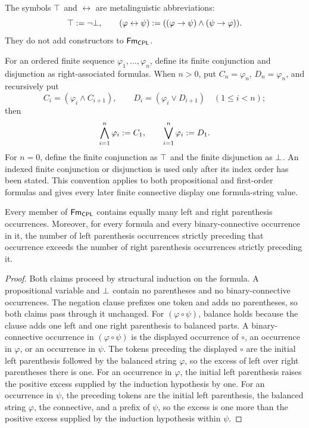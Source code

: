 \begin{definition}
The symbols \(\top\) and \(\leftrightarrow\) are metalinguistic
abbreviations:
\[
  \top\mathrel{:=}\neg\bot,
  \qquad
  (\varphi\leftrightarrow\psi)
  \mathrel{:=}((\varphi\to\psi)\land(\psi\to\varphi)).
\]
They do not add constructors to \(\mathsf{Fm}_{\mathsf{CPL}}\).
\end{definition}

For an ordered finite sequence \(\varphi_1,\ldots,\varphi_n\), define its
finite conjunction and disjunction as right-associated formulas.  When
\(n>0\), put \(C_n=\varphi_n\), \(D_n=\varphi_n\), and recursively put
\[
 C_i=(\varphi_i\land C_{i+1}),
 \qquad
 D_i=(\varphi_i\lor D_{i+1})
 \quad(1\leq i<n);
\]
then
\[
 \bigwedge_{i=1}^{n}\varphi_i\mathrel{:=} C_1,
 \qquad
 \bigvee_{i=1}^{n}\varphi_i\mathrel{:=} D_1.
\]
For \(n=0\), define the finite conjunction as \(\top\) and the finite
disjunction as \(\bot\).  An indexed finite conjunction or disjunction is
used only after its index order has been stated.  This convention applies to
both propositional and first-order formulas and gives every later finite
connective display one formula-string value.

\begin{lemma}
\label{lem:paren-count}
Every member of \(\mathsf{Fm}_{\mathsf{CPL}}\) contains equally many left and right
parenthesis occurrences.  Moreover, for every formula and every
binary-connective occurrence in it, the number of left parenthesis
occurrences strictly preceding that occurrence exceeds the number of right
parenthesis occurrences strictly preceding it.
\end{lemma}
\begin{proof}
Both claims proceed by structural induction on the formula.  A propositional
variable and \(\bot\) contain no parentheses and no binary-connective
occurrences.  The negation clause prefixes one token and adds no
parentheses, so both claims pass through it unchanged.  For
\((\varphi\circ\psi)\), balance holds because the clause adds one left and
one right parenthesis to balanced parts.  A binary-connective occurrence in
\((\varphi\circ\psi)\) is the displayed occurrence of \(\circ\), an
occurrence in \(\varphi\), or an occurrence in \(\psi\).  The tokens
preceding the displayed \(\circ\) are the initial left parenthesis followed
by the balanced string \(\varphi\), so the excess of left over right
parentheses there is one.  For an occurrence in \(\varphi\), the initial
left parenthesis raises the positive excess supplied by the induction
hypothesis by one.  For an occurrence in \(\psi\), the preceding tokens are
the initial left parenthesis, the balanced string \(\varphi\), the
connective, and a prefix of \(\psi\), so the excess is one more than the
positive excess supplied by the induction hypothesis within \(\psi\).
\end{proof}

